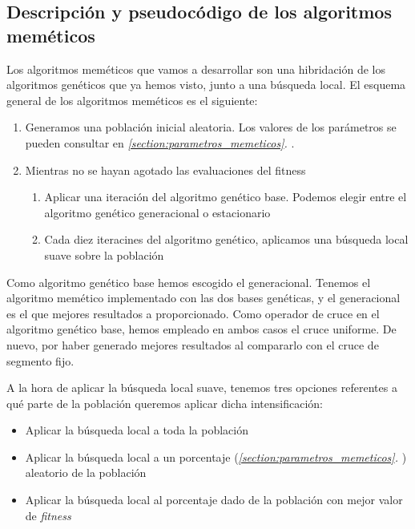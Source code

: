 \documentclass[11pt]{article}
\begin{document}
\pagebreak

\subsection{Descripción y pseudocódigo de los algoritmos meméticos}

Los algoritmos meméticos que vamos a desarrollar son una hibridación de los algoritmos genéticos que ya hemos visto, junto a una búsqueda local. El esquema general de los algoritmos meméticos es el siguiente:

\begin{enumerate}
    \item Generamos una población inicial aleatoria. Los valores de los parámetros se pueden consultar en \emph{\ref{section:parametros_memeticos}. }.
    \item Mientras no se hayan agotado las evaluaciones del fitness
        \begin{enumerate}
            \item Aplicar una iteración del algoritmo genético base. Podemos elegir entre el algoritmo genético generacional o estacionario
            \item Cada diez iteracines del algoritmo genético, aplicamos una búsqueda local suave sobre la población
        \end{enumerate}
\end{enumerate}

Como algoritmo genético base hemos escogido el generacional. Tenemos el algoritmo memético implementado con las dos bases genéticas, y el generacional es el que mejores resultados a proporcionado. Como operador de cruce en el algoritmo genético base, hemos empleado en ambos casos el cruce uniforme. De nuevo, por haber generado mejores resultados al compararlo con el cruce de segmento fijo.

A la hora de aplicar la búsqueda local suave, tenemos tres opciones referentes a qué parte de la población queremos aplicar dicha intensificación:

\begin{itemize}
    \item Aplicar la búsqueda local a toda la población
    \item Aplicar la búsqueda local a un porcentaje (\emph{\ref{section:parametros_memeticos}. }) aleatorio de la población
    \item Aplicar la búsqueda local al porcentaje dado de la población con mejor valor de \emph{fitness}
\end{itemize}
\end{document}
